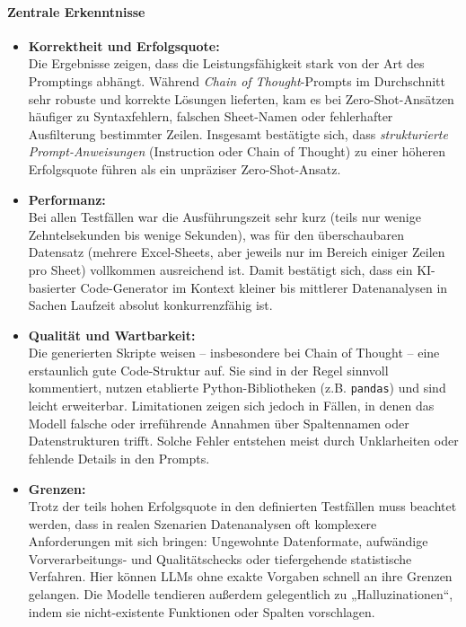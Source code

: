 \documentclass[11pt,a4paper]{article}
\begin{document}
\paragraph{Zentrale Erkenntnisse}
\begin{itemize}
    \item \textbf{Korrektheit und Erfolgsquote:}\\Die Ergebnisse zeigen, dass die Leistungsfähigkeit stark von der Art des Promptings abhängt. Während \emph{Chain of Thought}-Prompts im Durchschnitt sehr robuste und korrekte Lösungen lieferten, kam es bei Zero-Shot-Ansätzen häufiger zu Syntaxfehlern, falschen Sheet-Namen oder fehlerhafter Ausfilterung bestimmter Zeilen. Insgesamt bestätigte sich, dass \emph{strukturierte Prompt-Anweisungen} (Instruction oder Chain of Thought) zu einer höheren Erfolgsquote führen als ein unpräziser Zero-Shot-Ansatz.
    \item \textbf{Performanz:}\\Bei allen Testfällen war die Ausführungszeit sehr kurz (teils nur wenige Zehntelsekunden bis wenige Sekunden), was für den überschaubaren Datensatz (mehrere Excel-Sheets, aber jeweils nur im Bereich einiger Zeilen pro Sheet) vollkommen ausreichend ist. Damit bestätigt sich, dass ein KI-basierter Code-Generator im Kontext kleiner bis mittlerer Datenanalysen in Sachen Laufzeit absolut konkurrenzfähig ist.
    \item \textbf{Qualität und Wartbarkeit:}\\Die generierten Skripte weisen – insbesondere bei Chain of Thought – eine erstaunlich gute Code-Struktur auf. Sie sind in der Regel sinnvoll kommentiert, nutzen etablierte Python-Bibliotheken (z.B. \texttt{pandas}) und sind leicht erweiterbar. Limitationen zeigen sich jedoch in Fällen, in denen das Modell falsche oder irreführende Annahmen über Spaltennamen oder Datenstrukturen trifft. Solche Fehler entstehen meist durch Unklarheiten oder fehlende Details in den Prompts.
    \item \textbf{Grenzen:}\\Trotz der teils hohen Erfolgsquote in den definierten Testfällen muss beachtet werden, dass in realen Szenarien Datenanalysen oft komplexere Anforderungen mit sich bringen: Ungewohnte Datenformate, aufwändige Vorverarbeitungs- und Qualitätschecks oder tiefergehende statistische Verfahren. Hier können LLMs ohne exakte Vorgaben schnell an ihre Grenzen gelangen. Die Modelle tendieren außerdem gelegentlich zu „Halluzinationen“, indem sie nicht-existente Funktionen oder Spalten vorschlagen.
\end{itemize}
\end{document}
